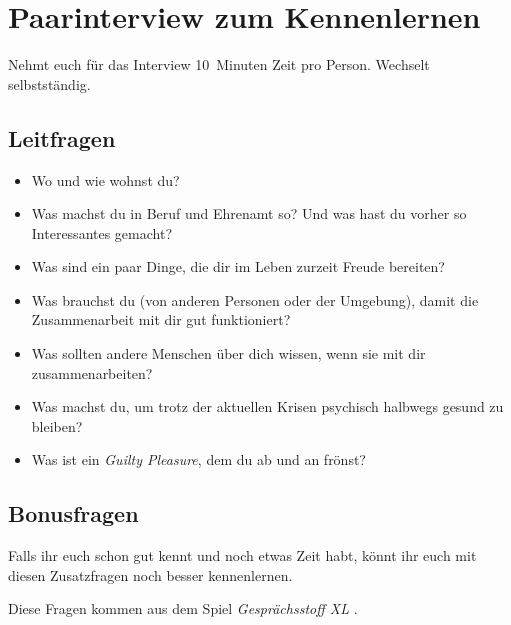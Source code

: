 \section{Paarinterview zum Kennenlernen}
\label{paarinterview}

Nehmt euch für das Interview 10~Minuten Zeit pro Person. Wechselt selbstständig.

\subsection{Leitfragen}

\begin{itemize}
  \item Wo und wie wohnst du?
  \item Was machst du in Beruf und Ehrenamt so? Und was hast du vorher so Interessantes gemacht?
  \item Was sind ein paar Dinge, die dir im Leben zurzeit Freude bereiten?
  \item Was brauchst du (von anderen Personen oder der Umgebung), damit die Zusammenarbeit mit dir gut funktioniert?
  \item Was sollten andere Menschen über dich wissen, wenn sie mit dir zusammenarbeiten?
  \item Was machst du, um trotz der aktuellen Krisen psychisch halbwegs gesund zu bleiben?
  \item Was ist ein \emph{Guilty Pleasure}, dem du ab und an frönst?
\end{itemize}


\subsection{Bonusfragen}

Falls ihr euch schon gut kennt und noch etwas Zeit habt, könnt ihr euch mit diesen Zusatzfragen noch besser kennenlernen.

Diese Fragen kommen aus dem Spiel \emph{Gesprächsstoff XL} \cite{gespraechsstoff}.

